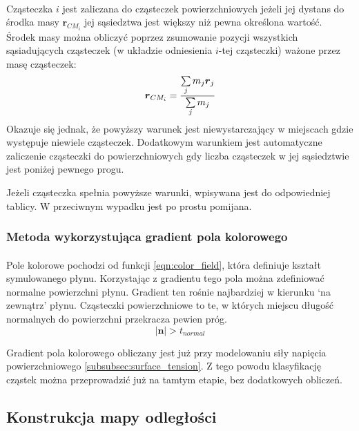 \paragraph{}
Cząsteczka $i$ jest zaliczana do cząsteczek powierzchniowych jeżeli jej dystans do środka masy $\boldsymbol{r}_{CM_{i}}$ jej sąsiedztwa jest większy niż pewna określona wartość. Środek masy można obliczyć poprzez zsumowanie pozycji wszystkich sąsiadujących cząsteczek (w układzie odniesienia $i$-tej cząsteczki) ważone przez masę cząsteczek:
\begin{equation}
\boldsymbol{r}_{CM_{i}} = {{\sum\limits_{j} {m_j \boldsymbol{r}_{j}}} \over {\sum\limits_{j} {m_j}}}
\label{eqn:center_mass}
\end{equation}
Okazuje się jednak, że powyższy warunek jest niewystarczający w miejscach gdzie występuje niewiele cząsteczek. Dodatkowym warunkiem jest automatyczne zaliczenie cząsteczki do powierzchniowych gdy liczba cząsteczek w jej sąsiedztwie jest poniżej pewnego progu.
\par
Jeżeli cząsteczka spełnia powyższe warunki, wpisywana jest do odpowiedniej tablicy. W przeciwnym wypadku jest po prostu pomijana.
\par
\subsubsection{Metoda wykorzystująca gradient pola kolorowego}

\paragraph{}
Pole kolorowe pochodzi od funkcji \eqref{eqn:color_field}, która definiuje kształt symulowanego płynu. Korzystając z gradientu tego pola można zdefiniować normalne powierzchni płynu. Gradient ten rośnie najbardziej w kierunku `na zewnątrz' płynu. Cząsteczki powierzchniowe to te, w których miejscu długość normalnych do powierzchni przekracza pewien próg.
\begin{equation}
|\boldsymbol{n}| > t_{normal}
\end{equation}
\par
Gradient pola kolorowego obliczany jest już przy modelowaniu siły napięcia powierzchniowego \eqref{subsubsec:surface_tension}. Z tego powodu klasyfikację cząstek można przeprowadzić już na tamtym etapie, bez dodatkowych obliczeń.
\par

\subsection{Konstrukcja mapy odległości}

